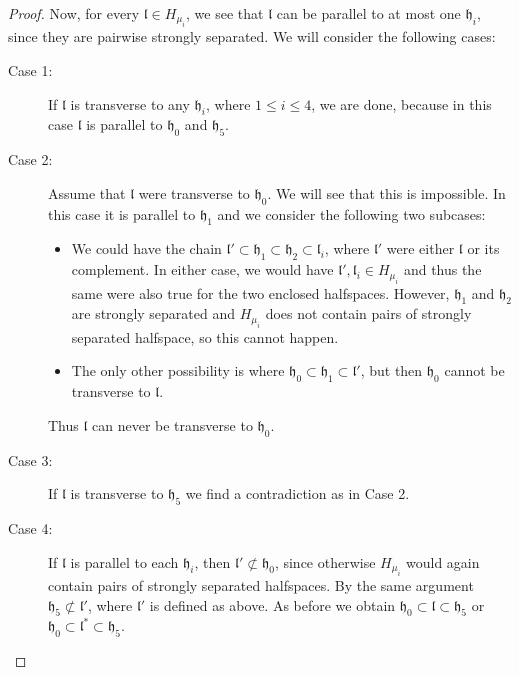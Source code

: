 \begin{proof}
  Now, for every \(\mathfrak{l} \in H_{\mu_i}\), we see that \(\mathfrak{l}\) can be parallel to at most one \(\mathfrak{h}_i\), since they are pairwise strongly separated. We will consider the following cases:
  \begin{description}
  \item[Case 1:] If \(\mathfrak{l}\) is transverse to any \(\mathfrak{h}_i\), where \(1 \leq i \leq 4\), we are done, because in this case \(\mathfrak{l}\) is parallel to \(\mathfrak{h}_0\) and \(\mathfrak{h}_5\).
  \item[Case 2:] Assume that \(\mathfrak{l}\) were transverse to \(\mathfrak{h}_0\). We will see that this is impossible. In this case it is parallel to \(\mathfrak{h}_1\) and we consider the following two subcases:
    \begin{itemize}
    \item We could have the chain \(\mathfrak{l}' \subset \mathfrak{h}_1 \subset \mathfrak{h}_2 \subset \mathfrak{l}_i\), where \(\mathfrak{l}'\) were either \(\mathfrak{l}\) or its complement. In either case, we would have \(\mathfrak{l}', \mathfrak{l}_i \in H_{\mu_i}\) and thus the same were also true for the two enclosed halfspaces. However, \(\mathfrak{h}_1\) and \(\mathfrak{h}_2\) are strongly separated and \(H_{\mu_i}\) does not contain pairs of strongly separated halfspace, so this cannot happen.
    \item The only other possibility is where \(\mathfrak{h}_0 \subset \mathfrak{h}_1 \subset \mathfrak{l}'\), but then \(\mathfrak{h}_0\) cannot be transverse to \(\mathfrak{l}\). 
    \end{itemize}
    Thus \(\mathfrak{l}\) can never be transverse to \(\mathfrak{h}_0\). 
  \item[Case 3:] If \(\mathfrak{l}\) is transverse to \(\mathfrak{h}_5\) we find a contradiction as in Case 2.
  \item[Case 4:] If \(\mathfrak{l}\) is parallel to each \(\mathfrak{h}_i\), then \(\mathfrak{l}' \not\subset \mathfrak{h_0}\), since otherwise \(H_{\mu_i}\) would again contain pairs of strongly separated halfspaces. By the same argument \(\mathfrak{h}_5 \not\subset \mathfrak{l}'\), where \(\mathfrak{l}'\) is defined as above. As before we obtain \(\mathfrak{h}_0 \subset \mathfrak{l} \subset \mathfrak{h}_5\) or \(\mathfrak{h}_0 \subset \mathfrak{l}^\ast \subset \mathfrak{h}_5\).
  \end{description}
\end{proof}

